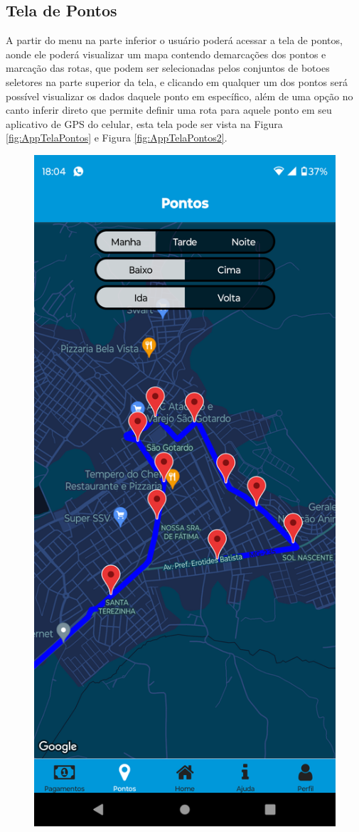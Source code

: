 \documentclass[
    12pt,                   %
    openright,              %
    oneside,                %
    a4paper,                %
    sumario=tradicional,    %
    english,                %
    brazil,                 %
    ]{abntex2}
\begin{document}
        \subsection{Tela de Pontos}
            A partir do menu na parte inferior o usuário poderá acessar a tela de pontos, aonde ele poderá visualizar um mapa contendo demarcações dos pontos e marcação das rotas, que podem ser selecionadas pelos conjuntos de botoes seletores na parte superior da tela, e clicando em qualquer um dos pontos será possível visualizar os dados daquele ponto em específico, além de uma opção no canto inferir direto que permite definir uma rota para aquele ponto em seu aplicativo de GPS do celular, esta tela pode ser vista na Figura \ref{fig:AppTelaPontos} e Figura \ref{fig:AppTelaPontos2}.

            \begin{figure}[!h]          
                \begin{minipage}{0.5\textwidth}
                    \centering
                    \includegraphics[width=0.8\linewidth]{Imagens/App Images User/AUPontos1.png}

\end{minipage}
\end{figure}
\end{document}
